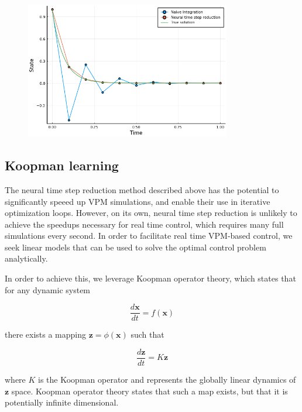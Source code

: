 \documentclass[12pt, letterpaper]{article}
\begin{document}
\begin{figure}[hbt!]
\centering
\includegraphics[width=0.8\textwidth]{figures/neural_time_step.png}
\caption{}
\label{fig:neural_time_step}
\end{figure}

\subsection{Koopman learning}

The neural time step reduction method described above has the potential to significantly speeed up VPM simulations, and enable their use in iterative optimization loops.  However, on its own, neural time step reduction is unlikely to achieve the speedups necessary for real time control, which requires many full simulations every second.  In order to facilitate real time VPM-based control, we seek linear models that can be used to solve the optimal control problem analytically. 

In order to achieve this, we leverage Koopman operator theory, which states that for any dynamic system

\begin{equation}
    \frac{d \mathbf{x}}{dt} = f(\mathbf{x})
\end{equation}

there exists a mapping $\mathbf{z} = \phi(\mathbf{x})$ such that 

\begin{equation}
    \label{eq:Koopman}
    \frac{d\mathbf{z}}{dt} = K \mathbf{z}
\end{equation}

where $K$ is the Koopman operator and represents the globally linear dynamics of $\mathbf{z}$ space. Koopman operator theory states that such a map exists, but that it is potentially infinite dimensional. 
\end{document}
